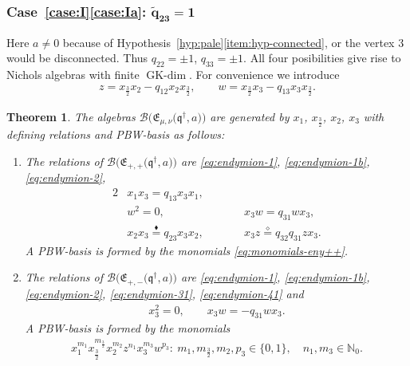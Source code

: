 \documentclass[10pt,a4paper]{amsart}
\numberwithin{equation}{section}
\newtheorem{Theorem}{Theorem}[section]
\newcommand{\GK}{\operatorname{GK-dim}}
\newcommand{\toba}{\mathscr B}
\newcommand{\N}{{\mathbb N}}
\newcommand{\eny}{\mathfrak{E}}
\newcommand{\bq}{\mathfrak{q}}
\newcommand{\bqs}{\bq^{\dagger}}
\newcommand{\tresdos}{\frac{3}{2}}
\begin{document}
\subsubsection[Case (I)(a): widetilde\{q\}\_\{23\} = 1]{Case~\ref{case:I}\ref{case:Ia}: $\boldsymbol{\widetilde{q}_{23} = 1}$}

Here $a\neq 0$ because of Hypothesis~\ref{hyp:pale}\ref{item:hyp-connected}, or the vertex 3 would be disconnected.
Thus $q_{22} = \pm 1$, $q_{33} = \pm 1$. All four posibilities give rise to Nichols algebras with finite $\GK$.
For convenience we introduce
\begin{align*}
z = x_{\tresdos}x_2 - q _{12} x_2x_{\tresdos},\qquad
w = x_{\tresdos}x_3 - q _{13} x_3x_{\tresdos}.
\end{align*}


\begin{Theorem} \label{th:endymion-rank4-1}
The algebras $\toba\big(\eny_{\mu, \nu}\big(\bqs, a\big)\big)$ are generated by $x_1$, $x_{\tresdos}$, $x_2$, $x_3$ with defining relations and PBW-basis as follows:
\begin{enumerate}[label=$(\alph*)$]\itemsep=0pt
\item The relations of $\toba\big(\eny_{+, +}\big(\bqs, a\big)\big)$ are
\eqref{eq:endymion-1}, \eqref{eq:endymion-1b}, \eqref{eq:endymion-2},
\begin{alignat}{2}\label{eq:endymion-31}
&x_1x_3 = q_{13}x_3x_1,&&
\\ \label{eq:endymion-31b}
&w^2 =0,&&x_3w = q_{31} wx_3,
\\ \label{eq:endymion-41}
&x_2 x_3 \overset{\blacklozenge}{=} q_{23} x_3x_2,\qquad &&
 x_3z \overset{\diamond}{=} q_{32}q_{31} z x_3.
\end{alignat}
A PBW-basis is formed by the monomials \eqref{eq:monomials-eny++}.

\item The relations of $\toba\big(\eny_{+, -}\big(\bqs, a\big)\big)$ are
\eqref{eq:endymion-1}, \eqref{eq:endymion-1b}, \eqref{eq:endymion-2}, \eqref{eq:endymion-31}, \eqref{eq:endymion-41} and
\begin{align}
\label{eq:endymion-32}
x_3 ^2=0, \qquad x_3 w = -q_{31} w x_3.
\end{align}
A PBW-basis is formed by the monomials
\begin{align*}
x_1^{m_1} x_{\tresdos}^{m_{\tresdos}} x_2^{m_2}z^{n_{1}}x_{3}^{m_{3}}w^{p_{3}}\colon\
m_1, m_{\tresdos}, m_2, p_{3} \in \{0,1\}, \quad n_1, m_3 \in\N_0.
\end{align*}


\end{enumerate}
\end{Theorem}
\end{document}
